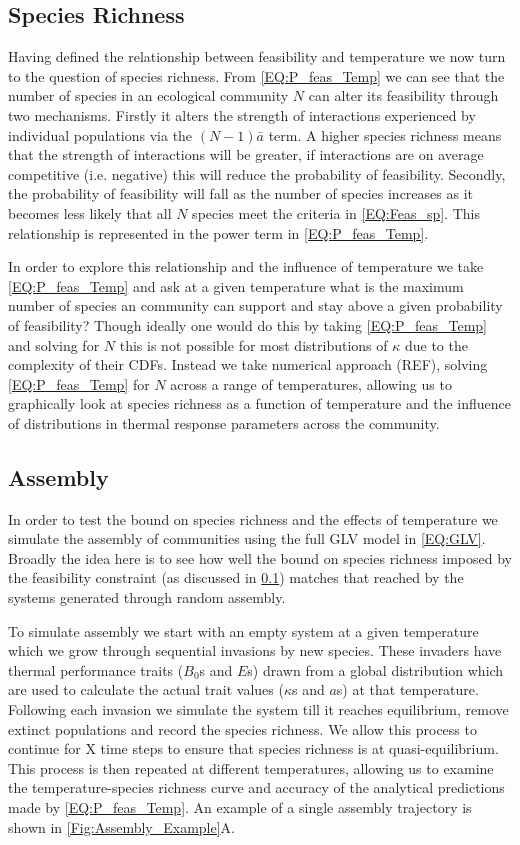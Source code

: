 \documentclass{article}
\begin{document}
\subsection{Species Richness} \label{SEC:N_Sp}
Having defined the relationship between feasibility and temperature we now turn to the question of species richness. From \cref{EQ:P_feas_Temp} we can see that the number of species in an ecological community $N$ can alter its feasibility through two mechanisms. Firstly it alters the strength of interactions experienced by individual populations via the $(N-1) \bar{a}$ term. A higher species richness means that the strength of interactions will be greater, if interactions are on average competitive (i.e. negative) this will reduce the probability of feasibility. Secondly, the probability of feasibility will fall as the number of species increases as it becomes less likely that all $N$ species meet the criteria in \cref{EQ:Feas_sp}. This relationship is represented in the power term in \cref{EQ:P_feas_Temp}. 

In order to explore this relationship and the influence of temperature we take \cref{EQ:P_feas_Temp} and ask at a given temperature what is the maximum number of species an community can support and stay above a given probability of feasibility? Though ideally one would do this by taking \cref{EQ:P_feas_Temp} and solving for $N$ this is not possible for most distributions of $\kappa$ due to the complexity of their CDFs. Instead we take numerical approach (REF), solving \cref{EQ:P_feas_Temp}  for $N$ across a range of temperatures, allowing us to graphically look at species richness as a function of temperature and the influence of distributions in thermal response parameters across the community.

\subsection{Assembly}
In order to test the bound on species richness and the effects of temperature we simulate the assembly of communities using the full GLV model in \cref{EQ:GLV}. Broadly the idea here is to see how well the bound on species richness imposed by the feasibility constraint (as discussed in \cref{SEC:N_Sp}) matches that reached by the systems generated through random assembly.  

To simulate assembly we start with an empty system at a given temperature which we grow through sequential invasions by new species. These invaders have thermal performance traits ($B_0$s and $E$s) drawn from a global distribution which are used to calculate the actual trait values ($\kappa$s and $a$s) at that temperature. Following each invasion we simulate the system till it reaches equilibrium, remove extinct populations and record the species richness. We allow this process to continue for X time steps to ensure that species richness  is at quasi-equilibrium. This process is then repeated at different temperatures, allowing us to examine the temperature-species richness curve and accuracy of the analytical predictions made by \cref{EQ:P_feas_Temp}. An example of a single assembly trajectory is shown in \cref{Fig:Assembly_Example}A.  
\end{document}
